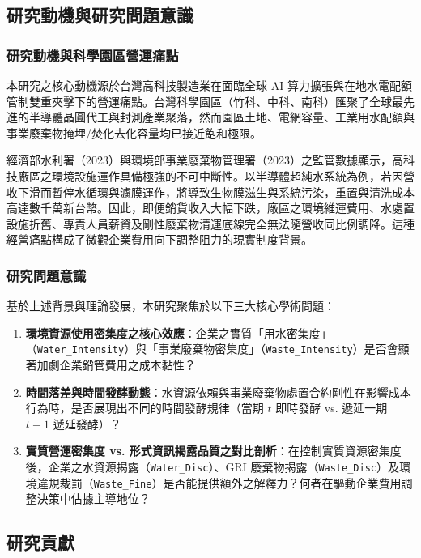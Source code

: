 \documentclass[12pt,a4paper]{article}
\begin{document}
\subsection{研究動機與研究問題意識}

\subsubsection{研究動機與科學園區營運痛點}

本研究之核心動機源於台灣高科技製造業在面臨全球 AI 算力擴張與在地水電配額管制雙重夾擊下的營運痛點。台灣科學園區（竹科、中科、南科）匯聚了全球最先進的半導體晶圓代工與封測產業聚落，然而園區土地、電網容量、工業用水配額與事業廢棄物掩埋/焚化去化容量均已接近飽和極限。

經濟部水利署（2023）與環境部事業廢棄物管理署（2023）之監管數據顯示，高科技廠區之環境設施運作具備極強的不可中斷性。以半導體超純水系統為例，若因營收下滑而暫停水循環與濾膜運作，將導致生物膜滋生與系統污染，重置與清洗成本高達數千萬新台幣。因此，即便銷貨收入大幅下跌，廠區之環境維運費用、水處置設施折舊、專責人員薪資及剛性廢棄物清運底線完全無法隨營收同比例調降。這種經營痛點構成了微觀企業費用向下調整阻力的現實制度背景。

\subsubsection{研究問題意識}

基於上述背景與理論發展，本研究聚焦於以下三大核心學術問題：
\begin{enumerate}[leftmargin=*]
    \item \textbf{環境資源使用密集度之核心效應}：企業之實質「用水密集度」（\texttt{Water\_Intensity}）與「事業廢棄物密集度」（\texttt{Waste\_Intensity}）是否會顯著加劇企業銷管費用之成本黏性？
    \item \textbf{時間落差與時間發酵動態}：水資源依賴與事業廢棄物處置合約剛性在影響成本行為時，是否展現出不同的時間發酵規律（當期 $t$ 即時發酵 vs. 遞延一期 $t-1$ 遞延發酵）？
    \item \textbf{實質營運密集度 vs. 形式資訊揭露品質之對比剖析}：在控制實質資源密集度後，企業之水資源揭露（\texttt{Water\_Disc}）、GRI 廢棄物揭露（\texttt{Waste\_Disc}）及環境違規裁罰（\texttt{Waste\_Fine}）是否能提供額外之解釋力？何者在驅動企業費用調整決策中佔據主導地位？
\end{enumerate}

\subsection{研究貢獻}
\end{document}
